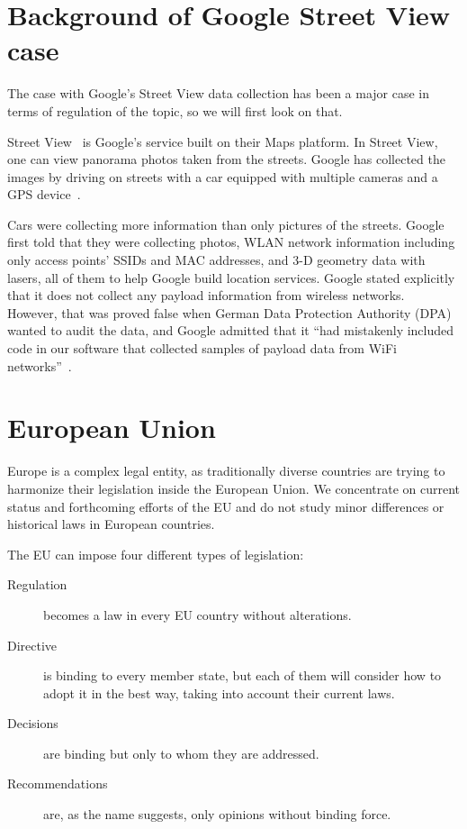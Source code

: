 \documentclass[12pt,a4paper,oneside,pdftex]{report}
\begin{document}
\section{Background of Google Street View case}
\label{sec:streetview}

The case with Google's Street View data collection has been a major case in terms of regulation of the topic, so we will first look on that. 

Street View~\cite{googlestreetview} is Google's service built on their Maps platform. In Street View, one can view panorama photos taken from the streets. Google has collected the images by driving on streets with a car equipped with multiple cameras and a GPS device~\cite{streetview_behindscenes}.

Cars were collecting more information than only pictures of the streets. Google first told that they were collecting photos, WLAN network information including only access points' SSIDs and MAC addresses, and 3-D geometry data with lasers, all of them to help Google build location services. Google stated explicitly that it does not collect any payload information from wireless networks.~\cite{fleischer_datacollected,google_wifi_collection} However, that was proved false when German Data Protection Authority (DPA) wanted to audit the data, and Google admitted that it ``had mistakenly included code in our software that collected samples of payload data from WiFi networks''~\cite{eustace_datacollected}.

\section{European Union}
\label{sec:legal_europe}

Europe is a complex legal entity, as traditionally diverse countries are trying to harmonize their legislation inside the European Union. We concentrate on current status and forthcoming efforts of the EU and do not study minor differences or historical laws in European countries.

The EU can impose four different types of legislation:~\cite{lisbon_288}
\begin{description}
     \item[Regulation] becomes a law in every EU country without alterations.
     \item[Directive] is binding to every member state, but each of them will consider how to adopt it in the best way, taking into account their current laws.
     \item[Decisions] are binding but only to whom they are addressed.
     \item[Recommendations] are, as the name suggests, only opinions without binding force.
\end{description}
\end{document}
